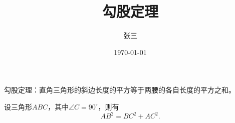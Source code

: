 \documentclass{ctexart} %
\title{\heiti 勾股定理} %
\author{\kaishu 张三} %
\date{\today} %
\newcommand{\degree}{^\circ} %
\begin{document}
	
	\maketitle %
	
	勾股定理：直角三角形的斜边长度的平方等于两腰的各自长度的平方之和。
	
	设三角形$ ABC $，其中$ \angle C = 90\degree $，则有
	\begin{equation}	
	AB^2 = 	BC^2 + AC^2.	
	\end{equation}
	
\end{document}
